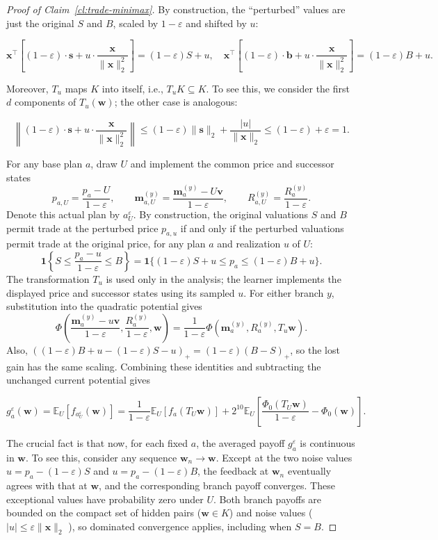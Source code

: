 \documentclass[11pt]{article}
\newcommand{\Esub}[2]{\mathbb E_{#1}\left[#2\right]}
\newcommand{\norm}[1]{\lVert #1\rVert_2}
\newcommand{\bm}{\boldsymbol m}
\newcommand{\bx}{\boldsymbol x}
\begin{document}
\begin{proof}[Proof of Claim~\ref{cl:trade-minimax}]
{By construction,} the ``perturbed'' values are just the original $S$ and $B$, {scaled by $1-\varepsilon$ and shifted by $u$}:

\[
    \bx^\top \left[(1-\varepsilon)\cdot \boldsymbol s+u\cdot \frac{\bx}{\norm{\bx}^2}\right] = (1-\varepsilon)S + u, \quad \bx^\top \left[(1-\varepsilon)\cdot \boldsymbol b+u\cdot \frac{\bx}{\norm{\bx}^2}\right] = (1-\varepsilon)B + u.
\]

Moreover, $T_u$ {maps $K$ into itself}, i.e., $T_uK\subseteq K$. {To see this, we consider the first $d$ components of $T_u(\boldsymbol w)$; the other case is analogous}:

\[
 \left\lVert(1-\varepsilon)\cdot \boldsymbol s+u\cdot \frac{\bx}{\norm{\bx}^2}\right\rVert
 \le (1-\varepsilon)\norm{\boldsymbol s}+\frac{|u|}{\norm{\bx}}
 \le (1-\varepsilon)+\varepsilon
 =1.
\]

For any base plan $a$, draw $U$ and implement the common price and successor states
\[
 p_{a,U}=\frac{p_a-U}{1-\varepsilon},\qquad
 \bm_{a,U}^{(y)}=\frac{\bm_a^{(y)}-U \boldsymbol v}{1-\varepsilon},\qquad
 R_{a,U}^{(y)}=\frac{R_a^{(y)}}{1-\varepsilon}.
\]
Denote this actual plan by $a_U^\varepsilon$. {By construction,} the original valuations $S$ and $B$ {permit trade at} the perturbed price $p_{a,u}$ if and only if the perturbed valuations {permit trade at} the original price, for any plan $a$ and realization $u$ of $U$:
\[
 \mathbf1\!\left\{S\le\frac{p_a-u}{1-\varepsilon}\le B\right\}
 =\mathbf1\{(1-\varepsilon)S+u\le p_a\le (1-\varepsilon)B+u\}.
\]
{The transformation} $T_u$ is used only in the analysis; the learner implements the displayed price and successor states using its sampled $u$. For either branch $y$, substitution into the quadratic potential gives
\[
 \Phi\!\left(\frac{\bm_a^{(y)}-u \boldsymbol v}{1-\varepsilon},
                  \frac{R_a^{(y)}}{1-\varepsilon},\boldsymbol w\right)
 =\frac1{1-\varepsilon}\Phi(\bm_a^{(y)},R_a^{(y)},T_u\boldsymbol w).
\]
Also, $((1-\varepsilon)B+u-(1-\varepsilon)S-u)_+=(1-\varepsilon)(B-S)_+$, so the lost gain has the same scaling. Combining these identities and subtracting the unchanged current potential gives

\[
 g_a^\varepsilon(\boldsymbol w)
 =\Esub{U}{f_{a_U^\varepsilon}(\boldsymbol w)}
 =\frac1{1-\varepsilon}\Esub{U}{ f_a(T_U\boldsymbol w)}
   +2^{10}\Esub{U}{\frac{\Phi_0(T_U\boldsymbol w)}{1-\varepsilon}-\Phi_0(\boldsymbol w)}.
\]

    The crucial fact is that now, for each fixed $a$, the averaged payoff $g_a^\varepsilon$ is continuous in $\boldsymbol w$. To see this, consider any sequence $\boldsymbol w_n\to\boldsymbol w$. Except at the two noise values $u=p_a-(1-\varepsilon)S$ and $u=p_a-(1-\varepsilon)B$, the feedback at $\boldsymbol w_n$ eventually agrees with that at $\boldsymbol w$, and the corresponding branch payoff converges. These exceptional values have probability zero under $U$. Both branch payoffs are bounded on the compact set of hidden pairs ($\boldsymbol{w} \in K$) and noise values ($|u|\le\varepsilon\norm{\bx}$ ), so dominated convergence applies, including when $S=B$.


\end{proof}
\end{document}
